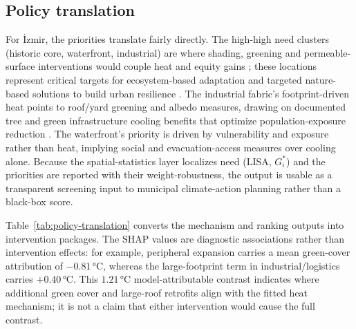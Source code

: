 \subsection{Policy translation}
\label{sec:disc-policy}
For \.{I}zmir, the priorities translate fairly directly. The high-high need clusters
(historic core, waterfront, industrial) are where shading, greening and
permeable-surface interventions would couple heat and equity gains
\citep{neumann2026ClimateJustice}; these locations represent critical targets for
ecosystem-based adaptation and targeted nature-based solutions to build urban
resilience \citep{geneletti2016EcosysteBased, wamsler2020EnvironmClimate,
babi2021NexusBetween}. The industrial fabric's footprint-driven heat
points to roof/yard greening and albedo measures, drawing on documented tree and green
infrastructure cooling benefits that optimize population-exposure reduction
\citep{yu2020CriticalReview, schwaab2021RoleUrban, marando2022UrbanHeat,
massaro2023SpatiallOptimize}. The waterfront's priority is driven by vulnerability
and exposure rather than heat, implying social and evacuation-access measures over
cooling alone. Because the spatial-statistics layer localizes need (LISA, $G_i^{*}$)
and the priorities are reported with their weight-robustness, the output is usable
as a transparent screening input to municipal climate-action planning rather than
a black-box score.

Table~\ref{tab:policy-translation} converts the mechanism and ranking outputs
into intervention packages. The SHAP values are diagnostic associations rather
than intervention effects: for example, peripheral expansion carries a mean
green-cover attribution of $-0.81\,\si{\celsius}$, whereas the large-footprint
term in industrial/logistics carries $+0.40\,\si{\celsius}$. This
$1.21\,\si{\celsius}$ model-attributable contrast indicates where additional
green cover and large-roof retrofits align with the fitted heat mechanism; it is
not a claim that either intervention would cause the full contrast.

